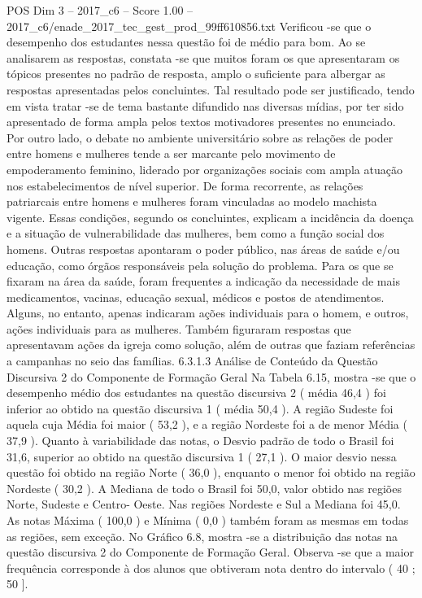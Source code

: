 \begin{textsample}{POS Dim 3 – 2017\_c6 – Score 1.00 – 2017\_c6/enade\_2017\_tec\_gest\_prod\_99ff610856.txt}
Verificou -se que o desempenho dos estudantes nessa questão foi de médio para bom.
Ao se analisarem as respostas, constata -se que muitos foram os que apresentaram os tópicos presentes no padrão de resposta, amplo o suficiente para albergar as respostas apresentadas pelos concluintes.
Tal resultado pode ser justificado, tendo em vista tratar -se de tema bastante difundido nas diversas mídias, por ter sido apresentado de forma ampla pelos textos motivadores presentes no enunciado.
Por outro lado, o debate no ambiente universitário sobre as relações de poder entre homens e mulheres tende a ser marcante pelo movimento de empoderamento feminino, liderado por organizações sociais com ampla atuação nos estabelecimentos de nível superior.
De forma recorrente, as relações patriarcais entre homens e mulheres foram vinculadas ao modelo machista vigente.
Essas condições, segundo os concluintes, explicam a incidência da doença e a situação de vulnerabilidade das mulheres, bem como a função social dos homens.
Outras respostas apontaram o poder público, nas áreas de saúde e/ou educação, como órgãos responsáveis pela solução do problema.
Para os que se fixaram na área da saúde, foram frequentes a indicação da necessidade de mais medicamentos, vacinas, educação sexual, médicos e postos de atendimentos.
Alguns, no entanto, apenas indicaram ações individuais para o homem, e outros, ações individuais para as mulheres.
Também figuraram respostas que apresentavam ações da igreja como solução, além de outras que faziam referências a campanhas no seio das famílias. 6.3.1.3 Análise de Conteúdo da Questão Discursiva 2 do Componente de Formação Geral Na Tabela 6.15, mostra -se que o desempenho médio dos estudantes na questão discursiva 2 ( média 46,4 ) foi inferior ao obtido na questão discursiva 1 ( média 50,4 ).
A região Sudeste foi aquela cuja Média foi maior ( 53,2 ), e a região Nordeste foi a de menor Média ( 37,9 ).
Quanto à variabilidade das notas, o Desvio padrão de todo o Brasil foi 31,6, superior ao obtido na questão discursiva 1 ( 27,1 ).
O maior desvio nessa questão foi obtido na região Norte ( 36,0 ), enquanto o menor foi obtido na região Nordeste ( 30,2 ).
A Mediana de todo o Brasil foi 50,0, valor obtido nas regiões Norte, Sudeste e Centro- Oeste.
Nas regiões Nordeste e Sul a Mediana foi 45,0.
As notas Máxima ( 100,0 ) e Mínima ( 0,0 ) também foram as mesmas em todas as regiões, sem exceção.
No Gráfico 6.8, mostra -se a distribuição das notas na questão discursiva 2 do Componente de Formação Geral.
Observa -se que a maior frequência corresponde à dos alunos que obtiveram nota dentro do intervalo ( 40 ; 50 ].

\end{textsample}
